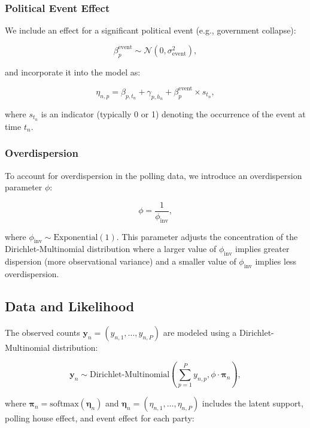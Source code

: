 \documentclass[
  letterpaper,
  DIV=11,
  numbers=noendperiod]{scrartcl}
\begin{document}
\subsubsection{Political Event Effect}\label{political-event-effect}

We include an effect for a significant political event (e.g., government
collapse):

\[
\beta^{\text{event}}_p \sim \mathcal{N}\left(0, \sigma_{\text{event}}^2\right),
\]

and incorporate it into the model as:

\[
\eta_{n,p} = \beta_{p, t_n} + \gamma_{p, h_n} + \beta^{\text{event}}_p \times s_{t_n},
\]

where \(s_{t_n}\) is an indicator (typically 0 or 1) denoting the
occurrence of the event at time \(t_n\).

\subsubsection{Overdispersion}\label{overdispersion}

To account for overdispersion in the polling data, we introduce an
overdispersion parameter \(\phi\):

\[
\phi = \frac{1}{\phi_{\text{inv}}},
\]

where \(\phi_{\text{inv}} \sim \text{Exponential}(1)\). This parameter
adjusts the concentration of the Dirichlet-Multinomial distribution
where a larger value of \(\phi_{\text{inv}}\) implies greater dispersion
(more observational variance) and a smaller value of
\(\phi_{\text{inv}}\) implies less overdispersion.

\subsection{Data and Likelihood}\label{data-and-likelihood}

The observed counts
\(\mathbf{y}_{n} = \left(y_{n,1}, \dots, y_{n,P}\right)\) are modeled
using a Dirichlet-Multinomial distribution:

\[
\mathbf{y}_{n} \sim \text{Dirichlet-Multinomial}\left(\sum_{p=1}^P y_{n,p}, \phi \cdot \boldsymbol{\pi}_{n}\right),
\]

where
\(\boldsymbol{\pi}_{n} = \text{softmax}\left(\boldsymbol{\eta}_{n}\right)\)
and
\(\boldsymbol{\eta}_{n} = \left(\eta_{n,1}, \dots, \eta_{n,P}\right)\)
includes the latent support, polling house effect, and event effect for
each party:
\end{document}
